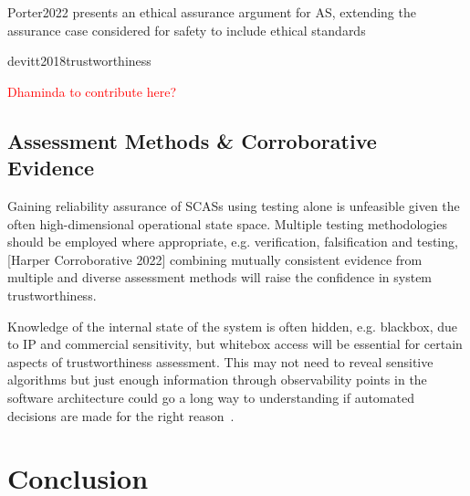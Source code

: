Porter2022 presents an ethical assurance argument for AS, extending the assurance case considered for safety to include ethical standards

devitt2018trustworthiness 

\textcolor{red}{Dhaminda to contribute here?}



\subsection{Assessment Methods \& Corroborative Evidence}
Gaining reliability assurance of SCASs using testing alone is unfeasible given the often high-dimensional operational state space. Multiple testing methodologies should be employed where appropriate, e.g. verification, falsification and testing, [Harper Corroborative 2022] combining mutually consistent evidence from multiple and diverse assessment methods will raise the confidence in system trustworthiness.

Knowledge of the internal state of the system is often hidden, e.g. blackbox, due to IP and commercial sensitivity, but whitebox access will be essential for certain aspects of trustworthiness assessment. This may not need to reveal sensitive algorithms but just enough information through observability points in the software architecture could go a long way to understanding if automated decisions are made for the right reason~\cite{koopman2018toward}. 




\section{Conclusion}\label{conclusion}









